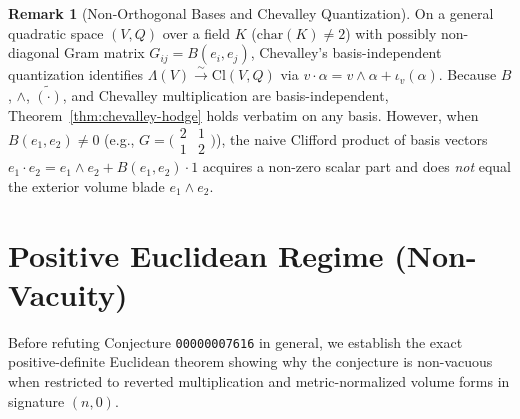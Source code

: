 \documentclass[11pt]{article}
\theoremstyle{definition}
\newtheorem{remark}[theorem]{Remark}
\newcommand{\Cl}{\mathrm{Cl}}
\begin{document}
\begin{remark}[Non-Orthogonal Bases and Chevalley Quantization]\label{rem:nonorth}
On a general quadratic space $(V, Q)$ over a field $K$ ($\mathrm{char}(K) \neq 2$) with possibly non-diagonal Gram matrix $G_{ij} = B(e_i, e_j)$, Chevalley's basis-independent quantization identifies $\Lambda(V) \xrightarrow{\sim} \Cl(V,Q)$ via $v\cdot\alpha = v\wedge\alpha + \iota_v(\alpha)$. Because $B$, $\wedge$, $\widetilde{(\cdot)}$, and Chevalley multiplication are basis-independent, Theorem~\ref{thm:chevalley-hodge} holds verbatim on any basis. However, when $B(e_1, e_2) \neq 0$ (e.g., $G = \bigl(\begin{smallmatrix}2&1\\1&2\end{smallmatrix}\bigr)$), the naive Clifford product of basis vectors $e_1\cdot e_2 = e_1\wedge e_2 + B(e_1,e_2)\cdot 1$ acquires a non-zero scalar part and does \emph{not} equal the exterior volume blade $e_1\wedge e_2$.
\end{remark}

\section{Positive Euclidean Regime (Non-Vacuity)}

Before refuting Conjecture \texttt{00000007616} in general, we establish the exact positive-definite Euclidean theorem showing why the conjecture is non-vacuous when restricted to reverted multiplication and metric-normalized volume forms in signature $(n, 0)$.
\end{document}
